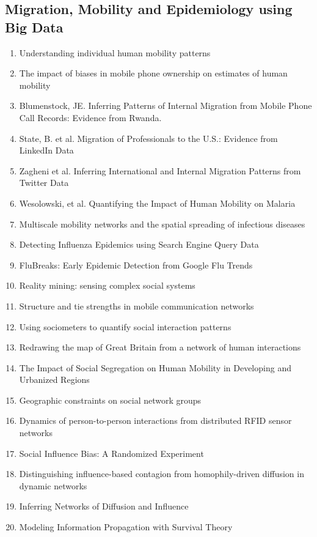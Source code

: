 \subsection{Migration, Mobility and Epidemiology using Big Data}
\begin{enumerate}
\item Understanding individual human mobility patterns\cite{Gonz_lez_2008}
\item The impact of biases in mobile phone ownership on estimates of human mobility
\item Blumenstock, JE. Inferring Patterns of Internal Migration from Mobile Phone Call Records: Evidence from Rwanda. 
\item State, B. et al. Migration of Professionals to the U.S.: Evidence from LinkedIn Data
\item Zagheni et al. Inferring International and Internal Migration Patterns from Twitter Data
\item Wesolowski, et al. Quantifying the Impact of Human Mobility on Malaria \cite{Wesolowski_2012}
\item Multiscale mobility networks and the spatial spreading of infectious diseases
\item  Detecting Influenza Epidemics using Search Engine Query Data
\item FluBreaks: Early Epidemic Detection from Google Flu Trends
\item Reality mining: sensing complex social systems
\item Structure and tie strengths in mobile communication networks
\item Using sociometers to quantify social interaction patterns
\item Redrawing the map of Great Britain from a network of human interactions
\item The Impact of Social Segregation on Human Mobility in Developing and Urbanized Regions
\item Geographic constraints on social network groups
\item Dynamics of person-to-person interactions from distributed RFID sensor networks
\item Social Influence Bias: A Randomized Experiment
\item Distinguishing influence-based contagion from homophily-driven diffusion in dynamic networks
\item Inferring Networks of Diffusion and Influence
\item Modeling Information Propagation with Survival Theory

\end{enumerate}
